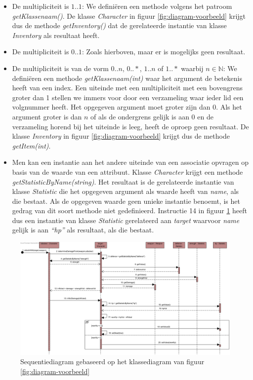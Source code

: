 \begin{itemize}
	\item De multipliciteit is $1..1$: We defini\"eren een methode volgens het patroom \textit{getKlassenaam()}. De klasse \textit{Character} in figuur \ref{fig:diagram-voorbeeld} krijgt dus de methode \textit{getInventory()} dat de gerelateerde instantie van klasse \textit{Inventory} als resultaat heeft.
	\item De multipliciteit is $0..1$: Zoals hierboven, maar er is mogelijks geen resultaat.
	\item De multipliciteit is van de vorm $0..n$, $0..*$, $1..n$ of $1..*$ waarbij $n \in \mathbb{N}$: We defini\"eren een methode \textit{getKlassenaam(int)} waar het argument de betekenis heeft van een index. Een uiteinde met een multipliciteit met een bovengrens groter dan 1 stellen we immers voor door een verzameling waar ieder lid een volgnummer heeft. Het opgegeven argument moet groter zijn dan 0. Als het argument groter is dan $n$ of als de ondergrens gelijk is aan 0 en de verzameling horend bij het uiteinde is leeg, heeft de oproep geen resultaat. De klasse \textit{Inventory} in figuur \ref{fig:diagram-voorbeeld} krijgt dus de methode \textit{getItem(int)}.
	\item Men kan een instantie aan het andere uiteinde van een associatie opvragen op basis van de waarde van een attribuut. Klasse \textit{Character} krijgt een methode \textit{getStatisticByName(string)}. Het resultaat is de gerelateerde instantie van klasse \textit{Statistic} die het opgegeven argument als waarde heeft van \textit{name}, als die bestaat. Als de opgegeven waarde geen unieke instantie benoemt, is het gedrag van dit soort methode niet gedefinieerd. Instructie 14 in figuur \ref{fig:seq-diagram-game} heeft dus een instantie van klasse \textit{Statistic} gerelateerd aan \textit{target} waarvoor \textit{name} gelijk is aan \textit{``hp''} als resultaat, als die bestaat.
\end{itemize}

\begin{figure}
	\includegraphics[height=0.55\textwidth]{chap-gedrag/seq-diagram-game.png}
	\caption{Sequentiediagram gebaseerd op het klassediagram van figuur \ref{fig:diagram-voorbeeld}}
	\label{fig:seq-diagram-game}
\end{figure}

